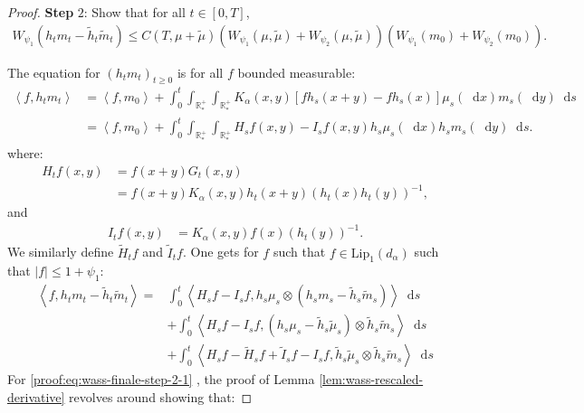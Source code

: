 \documentclass[11pt,a4paper]{article}
\newcommand{\RRP}{\mathbb{R}^+_*}
\newcommand{\Proc}[1]{\left(#1\right)_{t\geq 0}}
\newcommand{\brac}[1]{\left\langle#1\right\rangle}
\newcommand{\dd}{\mathop{}\!\mathrm{d}}
\begin{document}
\begin{proof}
    
    \textbf{Step} $2$: Show that for all $t \in [0,T]$, 
    \begin{align*}
        W_{\psi_1}(h_tm_t - \tilde{h}_t\tilde{m}_t) \leq C(T,\mu + \tilde{\mu})\left(W_{\psi_1}\left( \mu , \tilde{\mu}\right) + W_{\psi_2}\left( \mu , \tilde{\mu}\right)\right)\left(W_{\psi_1}(m_0) + W_{\psi_2}(m_0) \right).
    \end{align*}
    
    The equation for $\Proc{h_tm_t}$ is for all $f$  bounded measurable:
    \begin{align*}
        \brac{f,h_t m_t} 
        &= \brac{f,m_0} + \int_0^t \int_{\RRP} \int_{\RRP} K_\alpha(x,y) \left[fh_s(x+y) - fh_s(x)\right] \mu_s(\dd x) m_s(\dd y) \dd s \\
        &= \brac{f,m_0} + \int_0^t \int_{\RRP} \int_{\RRP} H_sf(x,y) - I_sf(x,y) h_s\mu_s(\dd x) h_sm_s(\dd y) \dd s.
    \end{align*}
    where:
    \begin{align*}
        H_tf(x,y) 
        &= f(x+y)G_t(x,y) \\
        &= f(x+y)K_\alpha(x,y)h_t(x+y)\left(h_t(x)h_t(y)\right)^{-1},
    \end{align*}
    and
    \begin{align*}
        I_tf(x,y) 
        &= K_\alpha(x,y)f(x)\left(h_t(y)\right)^{-1}.
    \end{align*}
    We similarly define $\tilde{H}_tf$ and $\tilde{I}_tf$. One gets for $f$ such that $f \in \text{Lip}_1(d_{\alpha})$ such that $|f| \leq 1 + \psi_1$:
    \begin{subequations}
    \begin{align}
        \brac{f, h_tm_t - \tilde{h}_t\tilde{m}_t} =& \int_0^t \brac{H_sf- I_sf ,h_s\mu_s \otimes \left(h_sm_s - \tilde{h}_s\tilde{m}_s \right) } \dd s\label{proof:eq:wass-finale-step-2-1}\\ 
        &+ \int_0^t\brac{H_sf- I_sf,\left(h_s\mu_s - \tilde{h}_s\tilde{\mu}_s\right)\otimes \tilde{h}_s\tilde{m}_s} \dd s\label{proof:eq:wass-finale-step-2-2} \\ 
        &+ \int_0^t \brac{H_sf-\tilde{H}_sf + \tilde{I}_sf - I_sf,\tilde{h}_s\tilde{\mu}_s\otimes \tilde{h}_s\tilde{m}_s}\dd s\label{proof:eq:wass-finale-step-2-3} 
    \end{align}
    \label{proof:eq:wass-finale-step-2}
    \end{subequations}
    For \eqref{proof:eq:wass-finale-step-2-1} , the proof of Lemma \ref{lem:wass-rescaled-derivative} revolves around showing that:

\end{proof}
\end{document}
